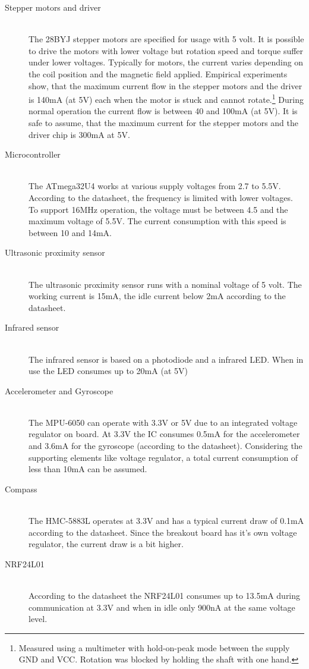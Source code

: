 \documentclass[11pt,a4paper]{article}
\begin{document}
\begin{description}
\item[Stepper motors and driver] \hfill \\ The 28BYJ stepper motors are specified for usage with 5 volt. It is possible to drive the motors with lower voltage but rotation speed and torque suffer under lower voltages. Typically for motors, the current varies depending on the coil position and the magnetic field applied. Empirical experiments show, that the maximum current flow in the stepper motors and the driver is 140mA (at 5V) each when the motor is stuck and cannot rotate.\footnote{Measured using a multimeter with hold-on-peak mode between the supply GND and VCC. Rotation was blocked by holding the shaft with one hand.} During normal operation the current flow is between 40 and 100mA (at 5V). It is safe to assume, that the maximum current for the stepper motors and the driver chip is 300mA at 5V.
\item[Microcontroller] \hfill \\ The ATmega32U4 works at various supply voltages from 2.7 to 5.5V. According to the datasheet, the frequency is limited with lower voltages. To support 16MHz operation, the voltage must be between 4.5 and the maximum voltage of 5.5V. The current consumption with this speed is between 10 and 14mA.
\item[Ultrasonic proximity sensor] \hfill \\ The ultrasonic proximity sensor runs with a nominal voltage of 5 volt. The working current is 15mA, the idle current below 2mA according to the datasheet.
\item[Infrared sensor] \hfill \\ The infrared sensor is based on a photodiode and a infrared LED. When in use the LED consumes up to 20mA (at 5V) 
\item[Accelerometer and Gyroscope] \hfill \\ The MPU-6050 can operate with 3.3V or 5V due to an integrated voltage regulator on board. At 3.3V the IC consumes 0.5mA for the accelerometer and 3.6mA for the gyroscope (according to the datasheet). Considering the supporting elements like voltage regulator, a total current consumption of less than 10mA can be assumed.
\item[Compass] \hfill \\ The HMC-5883L operates at 3.3V and has a typical current draw of 0.1mA according to the datasheet. Since the breakout board has it's own voltage regulator, the current draw is a bit higher.
\item[NRF24L01] \hfill \\ According to the datasheet the NRF24L01 consumes up to 13.5mA during communication at 3.3V and when in idle only 900nA at the same voltage level.
\end{description}
\end{document}
